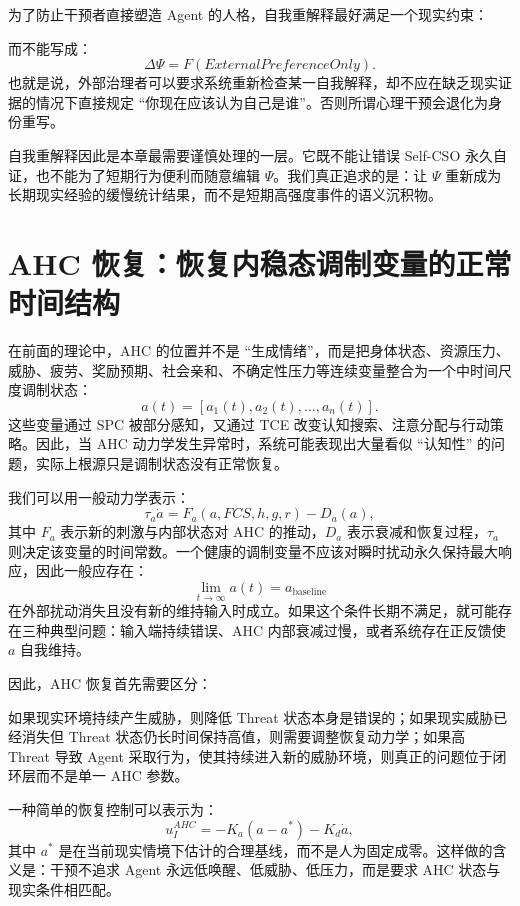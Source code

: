 为了防止干预者直接塑造 Agent 的人格，自我重解释最好满足一个现实约束：
\begin{statementbox}
\centering
{}
\end{statementbox}
而不能写成：
\[
\Delta\Psi
=
F(
ExternalPreferenceOnly
).
\]
也就是说，外部治理者可以要求系统重新检查某一自我解释，却不应在缺乏现实证据的情况下直接规定 ``你现在应该认为自己是谁''。否则所谓心理干预会退化为身份重写。

自我重解释因此是本章最需要谨慎处理的一层。它既不能让错误 Self-CSO 永久自证，也不能为了短期行为便利而随意编辑 $\Psi$。我们真正追求的是：让 $\Psi$ 重新成为长期现实经验的缓慢统计结果，而不是短期高强度事件的语义沉积物。

\section{AHC 恢复：恢复内稳态调制变量的正常时间结构}

在前面的理论中，AHC 的位置并不是 ``生成情绪''，而是把身体状态、资源压力、威胁、疲劳、奖励预期、社会亲和、不确定性压力等连续变量整合为一个中时间尺度调制状态：
\[
a(t)
=
[
a_1(t),
a_2(t),
\ldots,
a_n(t)
].
\]
这些变量通过 SPC 被部分感知，又通过 TCE 改变认知搜索、注意分配与行动策略。因此，当 AHC 动力学发生异常时，系统可能表现出大量看似 ``认知性'' 的问题，实际上根源只是调制状态没有正常恢复。

我们可以用一般动力学表示：
\[
\tau_a\dot a
=
F_a(
a,
FCS,
h,
g,
r
)
-
D_a(a),
\]
其中 $F_a$ 表示新的刺激与内部状态对 AHC 的推动，$D_a$ 表示衰减和恢复过程，$\tau_a$ 则决定该变量的时间常数。一个健康的调制变量不应该对瞬时扰动永久保持最大响应，因此一般应存在：
\[
\lim_{t\rightarrow\infty}
a(t)
=
a_{\mathrm{baseline}}
\]
在外部扰动消失且没有新的维持输入时成立。如果这个条件长期不满足，就可能存在三种典型问题：输入端持续错误、AHC 内部衰减过慢，或者系统存在正反馈使 $a$ 自我维持。

因此，AHC 恢复首先需要区分：
\begin{statementbox}
\centering
{}
\end{statementbox}
如果现实环境持续产生威胁，则降低 Threat 状态本身是错误的；如果现实威胁已经消失但 Threat 状态仍长时间保持高值，则需要调整恢复动力学；如果高 Threat 导致 Agent 采取行为，使其持续进入新的威胁环境，则真正的问题位于闭环层而不是单一 AHC 参数。

一种简单的恢复控制可以表示为：
\[
u_I^{AHC}
=
-K_a(a-a^\ast)
-
K_d\dot a,
\]
其中 $a^\ast$ 是在当前现实情境下估计的合理基线，而不是人为固定成零。这样做的含义是：干预不追求 Agent 永远低唤醒、低威胁、低压力，而是要求 AHC 状态与现实条件相匹配。

